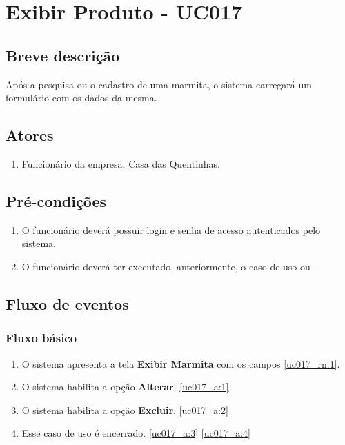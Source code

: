 \chapter{Exibir Produto - UC017} \label{uc017}

\section{Breve descrição}

Após a pesquisa ou o cadastro de uma marmita, o sistema carregará um formulário com os dados da mesma.

\section{Atores}

\begin{enumerate}
	\item Funcionário da empresa, Casa das Quentinhas.
\end{enumerate}

\section{Pré-condições}

\begin{enumerate}
	\item O funcionário deverá possuir login e senha de acesso autenticados pelo sistema.
	\item O funcionário deverá ter executado, anteriormente, o caso de uso  ou .
\end{enumerate}

\section{Fluxo de eventos}

\subsection{Fluxo básico}

\begin{enumerate}[label=P\arabic*]
	\item O sistema apresenta a tela \textbf{Exibir Marmita} com os campos \ref{uc017_rn:1}. \label{uc017_p:1}
	\item O sistema habilita a opção \textbf{Alterar}. \label{uc017_p:2}\ref{uc017_a:1} 
	\item O sistema habilita a opção \textbf{Excluir}. \label{uc017_p:3}\ref{uc017_a:2}
	\item Esse caso de uso é encerrado. \label{uc017_p:4}\ref{uc017_a:3} \ref{uc017_a:4}
\end{enumerate}

